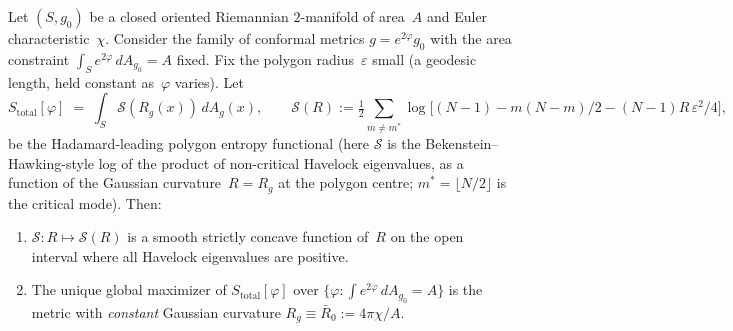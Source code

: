 \begin{proposition}
\label{prop:variation}
Let $(S, g_0)$ be a closed oriented Riemannian $2$-manifold
of area~$A$ and Euler characteristic~$\chi$.  Consider the
family of conformal metrics $g = e^{2\varphi} g_0$ with the
area constraint $\int_S e^{2\varphi}\,dA_{g_0} = A$ fixed.
Fix the polygon radius~$\varepsilon$ small
(a geodesic length, held constant as~$\varphi$ varies).
Let
\begin{equation}\label{eq:S-total-leading}
  S_{\mathrm{total}}[\varphi]
  \;=\; \int_S \mathcal{S}(R_g(x))\, dA_g(x),
  \qquad
  \mathcal{S}(R) := \tfrac{1}{2}\sum_{m \ne m^*}
    \log\!\bigl[(N{-}1) - m(N{-}m)/2 - (N{-}1)R\,\varepsilon^2/4\bigr],
\end{equation}
be the Hadamard-leading polygon entropy functional (here
$\mathcal{S}$ is the Bekenstein--Hawking-style log of the
product of non-critical Havelock eigenvalues, as a function of
the Gaussian curvature~$R = R_g$ at the polygon centre;
$m^* = \lfloor N/2 \rfloor$ is the critical mode).
Then:
\begin{enumerate}
\item[\textup{(i)}] $\mathcal{S}: R \mapsto \mathcal{S}(R)$
  is a smooth strictly concave function of~$R$ on the open
  interval where all Havelock eigenvalues are positive.
\item[\textup{(ii)}] The unique global maximizer of
  $S_{\mathrm{total}}[\varphi]$ over
  $\{\varphi : \int e^{2\varphi}\,dA_{g_0} = A\}$ is the metric
  with \emph{constant} Gaussian curvature $R_g \equiv \bar R_0
  := 4\pi\chi / A$.
\end{enumerate}
\end{proposition}

